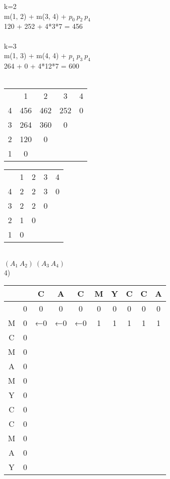 \documentclass{article}
\begin{document}
    k=2 \\
    m(1, 2) + m(3, 4) + $ p_{0}\ p_{2}\  p_{4}$\\
    120 + 252 + 4*3*7 = 456\\\\

    k=3 \\
    m(1, 3) + m(4, 4) + $ p_{1}\ p_{3}\  p_{4}$\\
    264 + 0 + 4*12*7 = 600\\\\

    \begin{tabular}{ c | c | c | c | c }
            
        & 1 & 2 & 3 & 4 \\ 
    4 & 456 & 462 & 252 & 0 \\  
    3 & 264 & 360 & 0 \\
    2 & 120 & 0 \\
    1 & 0     
    \end{tabular}
    \begin{tabular}{ c | c | c | c | c }
            
        & 1 & 2 & 3 & 4 \\ 
      4 & 2 & 2 & 3 & 0 \\  
      3 & 2 & 2 & 0 \\
      2 & 1 & 0 \\
      1 & 0     
    \end{tabular}\\
 $ (A_{1} \  A_{2}) \  (A_{3} \ A_{4}) $\\
 4)\\   
 \begin{tabular}{ c | c | c | c | c | c | c | c | c | c}           
             &  & C & A & C & M & Y & C & C & A \\ 
    \hline   & 0 & 0 & 0 & 0 & 0 & 0 & 0 & 0 & 0 \\
    \hline M & 0 &←0 &←0 &←0 & 1 & 1 & 1 & 1 & 1 \\  
    \hline C & 0 &   &   &   &   &   &   &   &   \\  
    \hline M & 0 &   &   &   &   &   &   &   &   \\  
    \hline A & 0 &   &   &   &   &   &   &   &   \\  
    \hline M & 0 &   &   &   &   &   &   &   &   \\  
    \hline Y & 0 &   &   &   &   &   &   &   &   \\  
    \hline C & 0 &   &   &   &   &   &   &   &   \\  
    \hline C & 0 &   &   &   &   &   &   &   &   \\  
    \hline M & 0 &   &   &   &   &   &   &   &   \\  
    \hline A & 0 &   &   &   &   &   &   &   &   \\  
    \hline Y & 0 &   &   &   &   &   &   &   &   \\  

\end{tabular}\\
\end{document}
